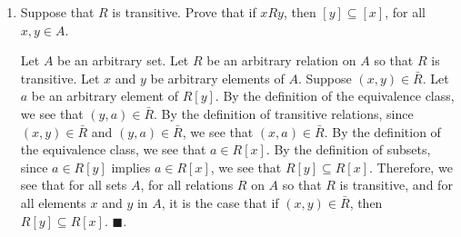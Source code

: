 \documentclass{article}
\theoremstyle{definition}
\renewcommand{\proof}{
	\medskip \fbox{Proof}
	\medskip }
\renewcommand{\qed}{\blacksquare}
\begin{document}
\begin{enumerate}
		Let $A$ be an arbitrary set.
		Let $R$ be an arbitrary relation on $A$ so that $R$ is symmetric.
		Let $x$ and $y$ be arbitrary elements of $A$.
		Suppose $x \in R[y]$.
		By the definition of the equivalence class, we see that $(x, y) \in \bar R$.
		By the definition of symmetric relations, since $(x, y) \in \bar R$, we see that $(y, x) \in \bar R$.
		By the definition of the equivalence class, we see that $y \in R[x]$.
		Therefore, we see that if $x \in R[y]$, then $y \in R[x]$.
		By a similar argument, exchanging $x$ for $y$, we see that if $y \in R[x]$, then $x \in R[y]$.
		Since if $x \in R[y]$, then $y \in R[x]$, and if $y \in R[x]$, then $x \in R[y]$, we see that $x \in R[y]$ if and only if $y \in R[x]$.
		Therefore, we see that for all sets $A$, for all relations $R$ on $A$ so that $R$ is symmetric, and for all elements $x$ and $y$ in $A$, it is the case that $x \in R[y]$ if and only if $y\in R[x]$.
		$\qed$.

		\smallskip

		\item
		Suppose that $R$ is transitive.
		Prove that if $x R y$, then $[y] \subseteq [x]$, for all $x, y \in A$.

		\proof

		Let $A$ be an arbitrary set.
		Let $R$ be an arbitrary relation on $A$ so that $R$ is transitive.
		Let $x$ and $y$ be arbitrary elements of $A$.
		Suppose $(x, y) \in \bar R$.
		Let $a$ be an arbitrary element of $R[y]$.
		By the definition of the equivalence class, we see that $(y, a) \in \bar R$.
		By the definition of transitive relations, since $(x, y) \in \bar R$ and  $(y, a) \in \bar R$, we see that $(x, a) \in \bar R$.
		By the definition of the equivalence class, we see that $a \in R[x]$.
		By the definition of subsets, since $a \in R[y]$ implies $a \in R[x]$, we see that $R[y] \subseteq R[x]$.
		Therefore, we see that for all sets $A$, for all relations $R$ on $A$ so that $R$ is transitive, and for all elements $x$ and $y$ in $A$, it is the case that if $(x, y) \in \bar R$, then $R[y] \subseteq R[x]$.
		$\qed$.

		\smallskip

	\end{enumerate}

\end{document}
